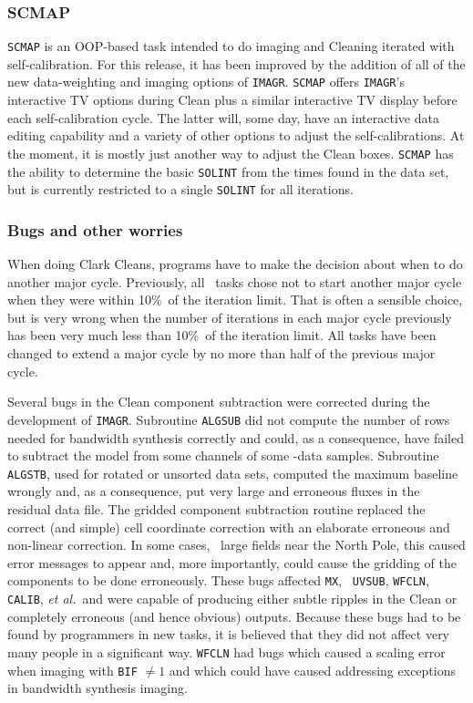 \subsubsection{SCMAP}

{\tt SCMAP} is an OOP-based task intended to do imaging and Cleaning
iterated with self-calibration.  For this release, it has been
improved by the addition of all of the new data-weighting and imaging
options of \hbox{{\tt IMAGR}}.  {\tt SCMAP} offers {\tt IMAGR}'s
interactive TV options during Clean plus a similar interactive TV
display before each self-calibration cycle.  The latter will, some
day, have an interactive data editing capability and a variety of
other options to adjust the self-calibrations.  At the moment, it is
mostly just another way to adjust the Clean boxes.  {\tt SCMAP} has
the ability to determine the basic {\tt SOLINT} from the times found
in the data set, but is currently restricted to a single {\tt SOLINT}
for all iterations.

\subsubsection{Bugs and other worries}

When doing Clark Cleans, programs have to make the decision about when
to do another major cycle.  Previously, all \AIPS\ tasks chose not to
start another major cycle when they were within 10\%\ of the iteration
limit.  That is often a sensible choice, but is very wrong when the
number of iterations in each major cycle previously has been very much
less than 10\%\ of the iteration limit.  All tasks have been changed
to extend a major cycle by no more than half of the previous major
cycle.

Several bugs in the Clean component subtraction were corrected during
the development of \hbox{{\tt IMAGR}}.  Subroutine {\tt ALGSUB} did
not compute the number of rows needed for bandwidth synthesis
correctly and could, as a consequence, have failed to subtract the
model from some channels of some \uv-data samples.  Subroutine {\tt
ALGSTB}, used for rotated or unsorted data sets, computed the maximum
baseline wrongly and, as a consequence, put very large and erroneous
fluxes in the residual data file.  The gridded component subtraction
routine replaced the correct (and simple) cell coordinate correction
with an elaborate erroneous and non-linear correction.  In some cases,
\ie\ large fields near the North Pole, this caused error messages to
appear and, more importantly, could cause the gridding of the
components to be done erroneously.  These bugs affected {\tt MX}, {\tt
UVSUB}, {\tt WFCLN}, {\tt CALIB}, {\it et al.}~and were capable of
producing either subtle ripples in the Clean or completely erroneous
(and hence obvious) outputs.  Because these bugs had to be found by
programmers in new tasks, it is believed that they did not affect very
many people in a significant way.  {\tt WFCLN} had bugs which caused a
scaling error when imaging with {\tt BIF} $\ne 1$ and which could have
caused addressing exceptions in bandwidth synthesis imaging.

